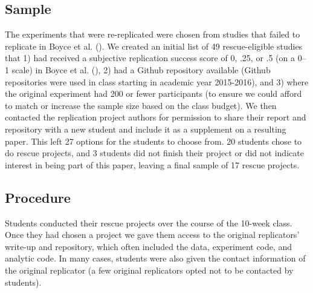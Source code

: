 \documentclass[
  english,
  a4paper,
]{article}
\begin{document}
\subsection{Sample}\label{sample}

The experiments that were re-replicated were chosen from studies that failed to replicate in Boyce et al. ().
We created an initial list of 49 rescue-eligible studies that 1) had received a subjective replication success score of 0, .25, or .5 (on a 0--1 scale) in Boyce et al. (), 2) had a Github repository available (Github repositories were used in class starting in academic year 2015-2016), and 3) where the original experiment had 200 or fewer participants (to ensure we could afford to match or increase the sample size based on the class budget).
We then contacted the replication project authors for permission to share their report and repository with a new student and include it as a supplement on a resulting paper.
This left 27 options for the students to choose from.
20 students chose to do rescue projects, and
3 students did not finish their project or did not indicate interest in being part of this paper, leaving a final sample of 17 rescue projects.

\subsection{Procedure}\label{procedure}

Students conducted their rescue projects over the course of the 10-week class.
Once they had chosen a project we gave them access to the original replicators' write-up and repository, which often included the data, experiment code, and analytic code.
In many cases, students were also given the contact information of the original replicator (a few original replicators opted not to be contacted by students).
\end{document}

